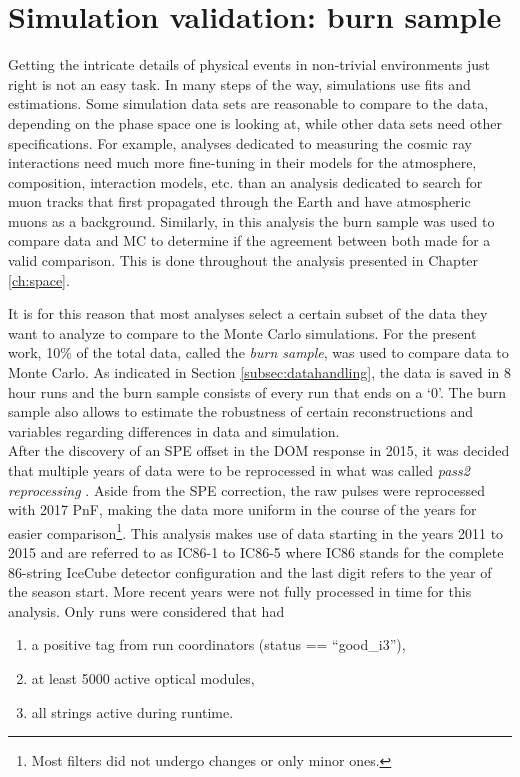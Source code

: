 \section{Simulation validation: burn sample}
\label{sec:burnsample}
Getting the intricate details of physical events in non-trivial environments just right is not an easy task. In many steps of the way, simulations use fits and estimations. Some simulation data sets are reasonable to compare to the data, depending on the phase space one is looking at, while other data sets need other specifications. For example, analyses dedicated to measuring the cosmic ray interactions need much more fine-tuning in their models for the atmosphere, composition, interaction models, etc. than an analysis dedicated to search for muon tracks that first propagated through the Earth and have atmospheric muons as a background. Similarly, in this analysis the burn sample was used to compare data and MC to determine if the agreement between both made for a valid comparison. This is done throughout the analysis presented in Chapter \ref{ch:space}.

It is for this reason that most analyses select a certain subset of the data they want to analyze to compare to the Monte Carlo simulations. For the present work, 10\% of the total data, called the \textit{burn sample}, was used to compare data to Monte Carlo. As indicated in Section \ref{subsec:datahandling}, the data is saved in 8 hour runs and the burn sample consists of every run that ends on a `0'. The burn sample also allows to estimate the robustness of certain reconstructions and variables regarding differences in data and simulation.\\

\noindent After the discovery of an SPE offset in the DOM response in 2015, it was decided that multiple years of data were to be reprocessed in what was called \textit{pass2 reprocessing} \cite{pass2}. Aside from the SPE correction, the raw pulses were reprocessed with 2017 PnF, making the data more uniform in the course of the years for easier comparison\footnote{Most filters did not undergo changes or only minor ones.}. This analysis makes use of data starting in the years 2011 to 2015 and are referred to as IC86-1 to IC86-5 where IC86 stands for the complete 86-string IceCube detector configuration and the last digit refers to the year of the season start. More recent years were not fully processed in time for this analysis. Only runs were considered that had
\vspace{2mm}
\begin{enumerate}
\item a positive tag from run coordinators (status == ``good\_i3''),
\item at least 5000 active optical modules,
\item all strings active during runtime.
\end{enumerate}
\vspace{2mm}

